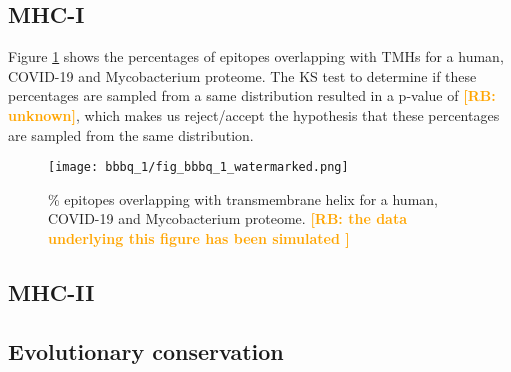 \documentclass{article}
\newcommand{\richel}[1]{\textcolor{orange}{\textbf{[RB: #1]}}}
\begin{document}
\subsection{MHC-I}

Figure \ref{fig:1} shows the percentages of epitopes overlapping 
with TMHs for a human, COVID-19 and Mycobacterium proteome.
The KS test to determine if these percentages are sampled from
a same distribution resulted in a p-value of \richel{unknown},
which makes us reject/accept the hypothesis that these percentages
are sampled from the same distribution. 

\begin{figure}[!htbp]
  \texttt{[image: bbbq\_1/fig\_bbbq\_1\_watermarked.png]}
  \caption{
    \% epitopes overlapping with transmembrane helix
    for a human, COVID-19 and Mycobacterium proteome.
    \richel{
      the data underlying this figure has been simulated
    }
  }
  \label{fig:1}
\end{figure}



\subsection{MHC-II}

\subsection{Evolutionary conservation}




\end{document}

